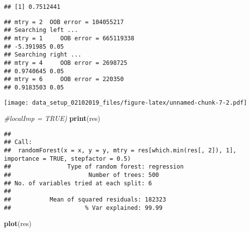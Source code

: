\documentclass[]{article}
\newenvironment{Shaded}{\begin{snugshade}}{\end{snugshade}}
\newcommand{\KeywordTok}[1]{\textcolor[rgb]{0.13,0.29,0.53}{\textbf{{#1}}}}
\newcommand{\DataTypeTok}[1]{\textcolor[rgb]{0.13,0.29,0.53}{{#1}}}
\newcommand{\DecValTok}[1]{\textcolor[rgb]{0.00,0.00,0.81}{{#1}}}
\newcommand{\FloatTok}[1]{\textcolor[rgb]{0.00,0.00,0.81}{{#1}}}
\newcommand{\StringTok}[1]{\textcolor[rgb]{0.31,0.60,0.02}{{#1}}}
\newcommand{\CommentTok}[1]{\textcolor[rgb]{0.56,0.35,0.01}{\textit{{#1}}}}
\newcommand{\OtherTok}[1]{\textcolor[rgb]{0.56,0.35,0.01}{{#1}}}
\newcommand{\NormalTok}[1]{{#1}}
\begin{document}
\begin{verbatim}
## [1] 0.7512441
\end{verbatim}

\begin{Shaded}
\end{Shaded}

\begin{verbatim}
## mtry = 2  OOB error = 104055217 
## Searching left ...
## mtry = 1     OOB error = 665119338 
## -5.391985 0.05 
## Searching right ...
## mtry = 4     OOB error = 2698725 
## 0.9740645 0.05 
## mtry = 6     OOB error = 220350 
## 0.9183503 0.05
\end{verbatim}

\texttt{[image: data\_setup\_02102019\_files/figure-latex/unnamed-chunk-7-2.pdf]}

\begin{Shaded}
\begin{Highlighting}[]
              \CommentTok{#localImp = TRUE)}
\KeywordTok{print}\NormalTok{(res)}
\end{Highlighting}
\end{Shaded}

\begin{verbatim}
## 
## Call:
##  randomForest(x = x, y = y, mtry = res[which.min(res[, 2]), 1],      importance = TRUE, stepfactor = 0.5) 
##                Type of random forest: regression
##                      Number of trees: 500
## No. of variables tried at each split: 6
## 
##           Mean of squared residuals: 182323
##                     % Var explained: 99.99
\end{verbatim}

\begin{Shaded}
\begin{Highlighting}[]
\KeywordTok{plot}\NormalTok{(res)}
\end{Highlighting}
\end{Shaded}
\end{document}
